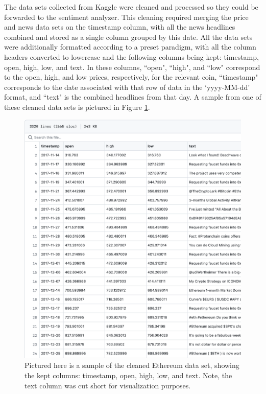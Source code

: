 \documentclass[10pt,twocolumn]{article}
\begin{document}
The data sets collected from Kaggle were cleaned and processed so they could be forwarded to the sentiment analyzer. This cleaning required merging the price and news data sets on the timestamp column, with all the news headlines combined and stored as a single column grouped by this date. All the data sets were additionally formatted according to a preset paradigm, with all the column headers converted to lowercase and the following columns being kept: timestamp, open, high, low, and text. In these columns, ``open", ``high", and ``low" correspond to the open, high, and low prices, respectively, for the relevant coin, ``timestamp" corresponds to the date associated with that row of data in the `yyyy-MM-dd' format, and ``text" is the combined headlines from that day. A sample from one of these cleaned data sets is pictured in Figure \ref{sample-cleaned-dataset}.

\begin{figure}
    \centering
    \includegraphics[scale=0.30]{images/ethereum-sample-cleaned-dataset.png}
    \caption{
        Pictured here is a sample of the cleaned Ethereum data set, showing the kept columns: timestamp, open, high, low, and text. Note, the text column was cut short for visualization purposes.
    }
    \label{sample-cleaned-dataset}
\end{figure}
\end{document}
